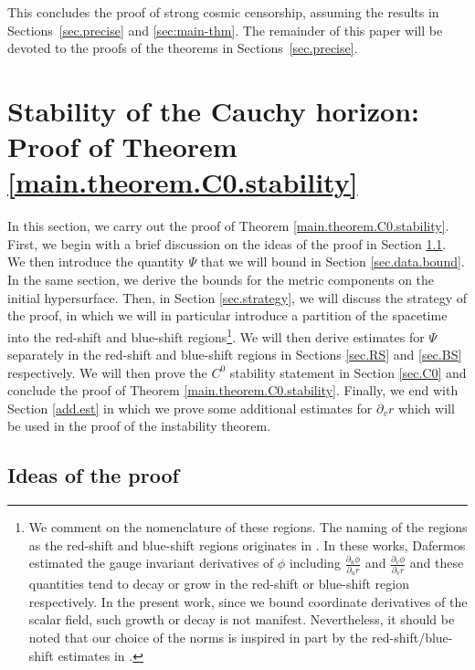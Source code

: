 \documentclass[10pt, reqno]{amsart}
\theoremstyle{definition}
\theoremstyle{remark}
\numberwithin{equation}{section}
\newcommand{\rd}{\partial}
\newcommand{\0}{\emptyset}
\newcommand{\f}{\frac}
\begin{document}
This concludes the proof of strong cosmic censorship, assuming the results in Sections~\ref{sec.precise} and \ref{sec:main-thm}. The remainder of this paper will be devoted to the proofs of the theorems in Sections~\ref{sec.precise}.

\section{Stability of the Cauchy horizon: Proof of Theorem \ref{main.theorem.C0.stability}}\label{sec.main.theorem.C0.stability}

In this section, we carry out the proof of Theorem \ref{main.theorem.C0.stability}. First, we begin with a brief discussion on the ideas of the proof in Section \ref{stab.ideas}. We then introduce the quantity $\Psi$ that we will bound in Section \ref{sec.data.bound}. In the same section, we derive the bounds for the metric components on the initial hypersurface. Then, in Section \ref{sec.strategy}, we will discuss the strategy of the proof, in which we will in particular introduce a partition of the spacetime into the red-shift and blue-shift regions\footnote{We comment on the nomenclature of these regions. The naming of the regions as the red-shift and blue-shift regions originates in \cite{D1, D2}. In these works, Dafermos estimated the gauge invariant derivatives of $\phi$ including $\f{\rd_u\phi}{\rd_u r}$ and $\f{\rd_v\phi}{\rd_v r}$ and these quantities tend to decay or grow in the red-shift or blue-shift region respectively. In the present work, since we bound coordinate derivatives of the scalar field, such growth or decay is not manifest. Nevertheless, it should be noted that our choice of the norms is inspired in part by the red-shift/blue-shift estimates in \cite{D1, D2}.}. We will then derive estimates for $\Psi$ separately in the red-shift and blue-shift regions in Sections \ref{sec.RS} and \ref{sec.BS} respectively. We will then prove the $C^0$ stability statement in Section \ref{sec.C0} and conclude the proof of Theorem \ref{main.theorem.C0.stability}. Finally, we end with Section \ref{add.est} in which we prove some additional estimates for $\rd_v r$ which will be used in the proof of the instability theorem.

\subsection{Ideas of the proof}\label{stab.ideas}
\end{document}
